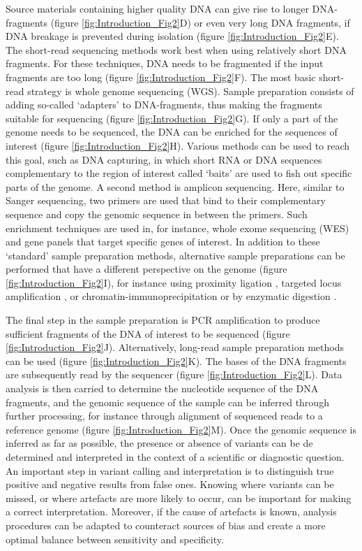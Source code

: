 Source materials containing higher quality DNA can give rise to longer DNA-fragments (figure \ref{fig:Introduction_Fig2}D) or even very long DNA fragments, if DNA breakage is prevented during isolation (figure \ref{fig:Introduction_Fig2}E). 
The short-read sequencing methods work best when using relatively short DNA fragments. 
For these techniques, DNA needs to be fragmented if the input fragments are too long (figure \ref{fig:Introduction_Fig2}F). 
The most basic short-read strategy is whole genome sequencing (WGS). 
Sample preparation consists of adding so-called ‘adapters’ to DNA-fragments, thus making the fragments suitable for sequencing (figure \ref{fig:Introduction_Fig2}G). 
If only a part of the genome needs to be sequenced, the DNA can be enriched for the sequences of interest (figure \ref{fig:Introduction_Fig2}H). 
Various methods can be used to reach this goal, such as DNA capturing, in which short RNA or DNA sequences complementary to the region of interest called ‘baits’ are used to fish out specific parts of the genome.
A second method is amplicon sequencing. Here, similar to Sanger sequencing, two primers are used that bind to their complementary sequence and copy the genomic sequence in between the primers. Such enrichment techniques are used in, for instance, whole exome sequencing (WES) and gene panels that target specific genes of interest. 
In addition to these ‘standard’ sample preparation methods, alternative sample preparations can be performed that have a different perspective on the genome (figure \ref{fig:Introduction_Fig2}I), for instance using proximity ligation \cite{Spielmann_2018}, targeted locus amplification \cite{de_Vree_2014}, or chromatin-immunoprecipitation or by enzymatic digestion \cite{Jiang_2018}.
 
The final step in the sample preparation is PCR amplification to produce sufficient fragments of the DNA of interest to be sequenced (figure \ref{fig:Introduction_Fig2}J). 
Alternatively, long-read sample preparation methods can be used (figure \ref{fig:Introduction_Fig2}K). 
The bases of the DNA fragments are subsequently read by the sequencer (figure \ref{fig:Introduction_Fig2}L). 
Data analysis is then carried to determine the nucleotide sequence of the DNA fragments, and the genomic sequence of the sample can be inferred through further processing, for instance through alignment of sequenced reads to a reference genome (figure \ref{fig:Introduction_Fig2}M). 
Once the genomic sequence is inferred as far as possible, the presence or absence of variants can be de determined and interpreted in the context of a scientific or diagnostic question. 
An important step in variant calling and interpretation is to distinguish true positive and negative results from false ones. 
Knowing where variants can be missed, or where artefacts are more likely to occur, can be important for making a correct interpretation. 
Moreover, if the cause of artefacts is known, analysis procedures can be adapted to counteract sources of bias and create a more optimal balance between sensitivity and specificity. 


